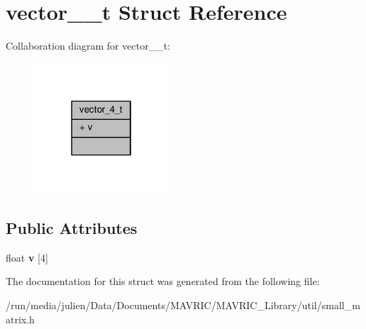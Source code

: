 \hypertarget{structvector__4__t}{\section{vector\+\_\+\_\+t Struct Reference}
\label{structvector__4__t}
}


Collaboration diagram for vector\+\_\+\_\+t\+:
\nopagebreak
\begin{figure}[H]
\begin{center}
\leavevmode
\includegraphics[width=142pt]{structvector__4__t__coll__graph}
\end{center}
\end{figure}
\subsection*{Public Attributes}
\begin{DoxyCompactItemize}
\item 
\hypertarget{structvector__4__t_a2d54ad47087ce7cdb10b18eb6142bc9a}{float {\bfseries v} \mbox{[}4\mbox{]}}\label{structvector__4__t_a2d54ad47087ce7cdb10b18eb6142bc9a}

\end{DoxyCompactItemize}


The documentation for this struct was generated from the following file\+:\begin{DoxyCompactItemize}
\item 
/run/media/julien/\+Data/\+Documents/\+M\+A\+V\+R\+I\+C/\+M\+A\+V\+R\+I\+C\+\_\+\+Library/util/small\+\_\+matrix.\+h\end{DoxyCompactItemize}
